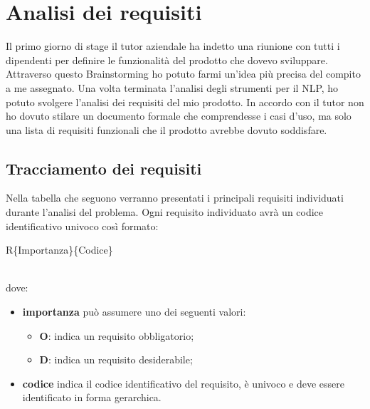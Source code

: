 
\chapter{Analisi dei requisiti}
\label{cap:analisi}

Il primo giorno di stage il tutor aziendale ha indetto una riunione con tutti i dipendenti per definire le funzionalità del prodotto che dovevo sviluppare. Attraverso questo \gls{Brainstorming} ho potuto farmi un'idea più precisa del compito a me assegnato. Una volta terminata l'analisi degli strumenti per il \gls{NLP}, ho potuto svolgere l'analisi dei requisiti del mio prodotto. In accordo con il tutor non ho dovuto stilare un documento formale che comprendesse i casi d'uso, ma solo una lista di requisiti funzionali che il prodotto avrebbe dovuto soddisfare.

\section{Tracciamento dei requisiti}
\label{requisiti}
Nella tabella che seguono verranno presentati i principali requisiti individuati durante l’analisi del problema.
Ogni requisito individuato avrà un codice identificativo univoco così formato: \\
\centerline{R\{Importanza\}\{Codice\}} \\ 
dove:
\begin{itemize}
	\item \textbf{importanza} può assumere uno dei seguenti valori:
	\begin{itemize}
		\item \textbf{O}: indica un requisito obbligatorio;
		\item \textbf{D}: indica un requisito desiderabile;
	\end{itemize}
	\item \textbf{codice} indica il codice identificativo del requisito, è univoco e deve essere
identificato in forma gerarchica.
\end{itemize}

